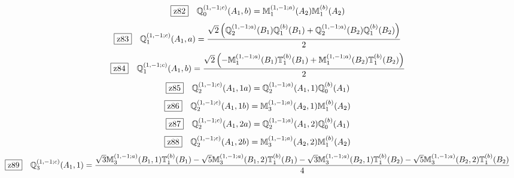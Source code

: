 \documentclass[fleqn,10pt,landscape]{jsarticle}
\begin{document}
\begin{dmath*}
\hspace*{3mm}\fbox{z82}\quad \mathbb{Q}_{0}^{(1,-1;c)}(A_{1},b)=\mathbb{M}_{1}^{(1,-1;a)}(A_{2}) \mathbb{M}_{1}^{(b)}(A_{2})
\end{dmath*}
\begin{dmath*}
\hspace*{3mm}\fbox{z83}\quad \mathbb{Q}_{1}^{(1,-1;c)}(A_{1},a)=\frac{\sqrt{2} \left(\mathbb{Q}_{2}^{(1,-1;a)}(B_{1}) \mathbb{Q}_{1}^{(b)}(B_{1}) + \mathbb{Q}_{2}^{(1,-1;a)}(B_{2}) \mathbb{Q}_{1}^{(b)}(B_{2})\right)}{2}
\end{dmath*}
\begin{dmath*}
\hspace*{3mm}\fbox{z84}\quad \mathbb{Q}_{1}^{(1,-1;c)}(A_{1},b)=\frac{\sqrt{2} \left(- \mathbb{M}_{1}^{(1,-1;a)}(B_{1}) \mathbb{T}_{1}^{(b)}(B_{1}) + \mathbb{M}_{1}^{(1,-1;a)}(B_{2}) \mathbb{T}_{1}^{(b)}(B_{2})\right)}{2}
\end{dmath*}
\begin{dmath*}
\hspace*{3mm}\fbox{z85}\quad \mathbb{Q}_{2}^{(1,-1;c)}(A_{1},1a)=\mathbb{Q}_{2}^{(1,-1;a)}(A_{1},1) \mathbb{Q}_{0}^{(b)}(A_{1})
\end{dmath*}
\begin{dmath*}
\hspace*{3mm}\fbox{z86}\quad \mathbb{Q}_{2}^{(1,-1;c)}(A_{1},1b)=\mathbb{M}_{3}^{(1,-1;a)}(A_{2},1) \mathbb{M}_{1}^{(b)}(A_{2})
\end{dmath*}
\begin{dmath*}
\hspace*{3mm}\fbox{z87}\quad \mathbb{Q}_{2}^{(1,-1;c)}(A_{1},2a)=\mathbb{Q}_{2}^{(1,-1;a)}(A_{1},2) \mathbb{Q}_{0}^{(b)}(A_{1})
\end{dmath*}
\begin{dmath*}
\hspace*{3mm}\fbox{z88}\quad \mathbb{Q}_{2}^{(1,-1;c)}(A_{1},2b)=\mathbb{M}_{3}^{(1,-1;a)}(A_{2},2) \mathbb{M}_{1}^{(b)}(A_{2})
\end{dmath*}
\begin{dmath*}
\hspace*{3mm}\fbox{z89}\quad \mathbb{Q}_{3}^{(1,-1;c)}(A_{1},1)=\frac{\sqrt{3} \mathbb{M}_{3}^{(1,-1;a)}(B_{1},1) \mathbb{T}_{1}^{(b)}(B_{1}) - \sqrt{5} \mathbb{M}_{3}^{(1,-1;a)}(B_{1},2) \mathbb{T}_{1}^{(b)}(B_{1}) - \sqrt{3} \mathbb{M}_{3}^{(1,-1;a)}(B_{2},1) \mathbb{T}_{1}^{(b)}(B_{2}) - \sqrt{5} \mathbb{M}_{3}^{(1,-1;a)}(B_{2},2) \mathbb{T}_{1}^{(b)}(B_{2})}{4}
\end{dmath*}
\end{document}

